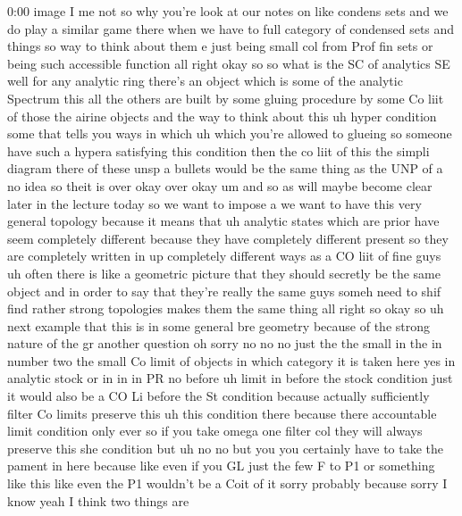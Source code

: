\begin{unfinished}{0:00}
image
I  me
not  so  why  you're  look  at  our  notes  on
like  condens  sets
and  we  do  play  a  similar  game  there  when
we  have  to  full  category  of  condensed
sets  and  things  so  way  to  think  about
them  e  just  being  small  col  from  Prof
fin  sets  or  being  such  accessible
function  all
right  okay  so  so  what  is  the  SC  of
analytics  SE  well  for  any  analytic  ring
there's  an  object  which  is  some  of  the
analytic  Spectrum  this  all  the  others
are  built  by  some  gluing  procedure  by
some  Co  liit  of  those  the  airine  objects
and  the  way  to  think  about  this  uh  hyper
condition  some  that  tells  you  ways  in
which  uh  which  you're  allowed  to  glueing
so  someone  have  such  a  hypera  satisfying
this  condition  then  the  co  liit  of
this  the  simpli  diagram  there  of  these
unsp  a  bullets  would  be  the  same  thing
as  the  UNP  of
a  no  idea
so  theit  is
over
okay
over  okay  um
and  so  as  will  maybe  become  clear  later
in  the  lecture  today  so  we  want  to
impose  a  we  want  to  have  this  very
general  topology  because  it  means  that
uh  analytic  states  which  are  prior  have
seem  completely  different  because  they
have  completely  different  present  so
they  are  completely  written  in  up
completely  different  ways  as  a  CO  liit
of  fine  guys  uh  often  there  is  like  a
geometric  picture  that  they  should
secretly  be  the  same  object  and  in  order
to  say  that  they're  really  the  same  guys
someh  need  to  shif  find  rather  strong
topologies  makes  them  the  same
thing  all  right  so  okay  so  uh  next
example  that  this  is  in  some  general
bre
geometry  because  of  the  strong  nature  of
the
gr  another
question  oh  sorry  no  no  no  just  the  the
small  in  the  in  number  two  the  small  Co
limit  of  objects  in  which  category  it  is
taken  here  yes  in  analytic  stock  or
in  in
in  PR  no
before  uh  limit  in  before  the  stock
condition  just  it  would  also  be  a  CO  Li
before  the  St  condition  because  actually
sufficiently  filter  Co  limits  preserve
this  uh  this  condition  there  because
there  accountable  limit  condition  only
ever  so  if  you  take  omega  one  filter  col
they  will  always  preserve
this  she
condition
but
uh  no  no  but  you  you  certainly  have  to
take  the  pament  in  here
because  like  even  if  you  GL  just  the  few
F  to  P1  or  something  like
this  like  even  the  P1  wouldn't  be  a  Coit
of  it  sorry  probably  because  sorry  I
know  yeah  I  think  two  things  are

\end{unfinished}
